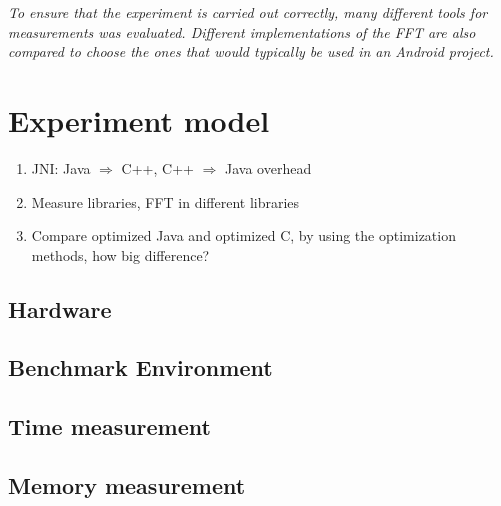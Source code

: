 \textit{To ensure that the experiment is carried out correctly, many different tools for measurements was evaluated. Different implementations of the FFT are also compared to choose the ones that would typically be used in an Android project.}

\section{Experiment model}


\begin{enumerate}
    \item JNI: Java $\Rightarrow$ C++, C++ $\Rightarrow$ Java overhead
    \item Measure libraries, FFT in different libraries
    \item Compare optimized Java and optimized C, by using the optimization methods, how big difference?
\end{enumerate}

\subsection{Hardware}
\subsection{Benchmark Environment}
\subsection{Time measurement}
\subsection{Memory measurement}

